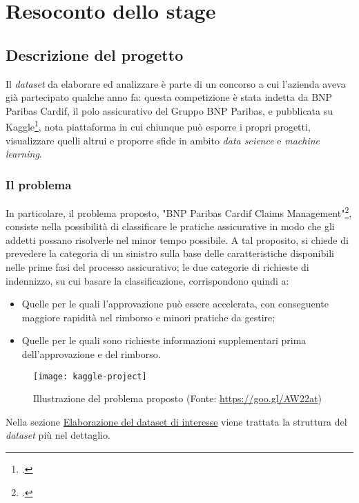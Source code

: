 
\chapter{Resoconto dello stage}
\label{cap:resoconto-stage}

\section{Descrizione del progetto}
Il \textit{dataset} da elaborare ed analizzare è parte di un concorso a cui l'azienda aveva già partecipato qualche anno fa: questa competizione è stata indetta da BNP Paribas Cardif, il polo assicurativo del Gruppo BNP Paribas, e pubblicata su Kaggle\footcite{site:kaggle}, nota piattaforma in cui chiunque può esporre i propri progetti, visualizzare quelli altrui e proporre sfide in ambito \textit{data science} e \textit{machine learning}.

\subsection{Il problema}
In particolare, il problema proposto, "BNP Paribas Cardif Claims Management"\footcite{site:kagglepr}, consiste nella possibilità di classificare le pratiche assicurative in modo che gli addetti possano risolverle nel minor tempo possibile. A tal proposito, si chiede di prevedere la categoria di un sinistro sulla base delle caratteristiche disponibili nelle prime fasi del processo assicurativo; le due categorie di richieste di indennizzo, su cui basare la classificazione, corrispondono quindi a:
\begin{itemize}
	\item Quelle per le quali l'approvazione può essere accelerata, con conseguente maggiore rapidità nel rimborso e minori pratiche da gestire;
	\item Quelle per le quali sono richieste informazioni supplementari prima dell'approvazione e del rimborso.
\end{itemize}
\clearpage
\begin{figure}[!h] 
	\centering 
	\texttt{[image: kaggle-project]}
	\caption{Illustrazione del problema proposto (Fonte: \href{https://goo.gl/AW22at}{https://goo.gl/AW22at})}
\end{figure}
Nella sezione \hyperref[dataset]{Elaborazione del dataset di interesse} viene trattata la struttura del \textit{dataset} più nel dettaglio.

